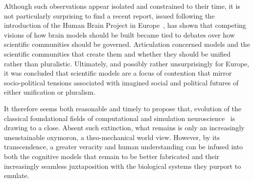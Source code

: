 \documentclass[11pt,3p,twocolumn]{JMN}
\begin{document}
Although such observations appear isolated and constrained to their time, it is not particularly surprising to find a recent report, issued following the introduction of the Human Brain Project in Europe~\citep{mahfoud21}, has shown that competing visions of how brain models should be built became tied to debates over how scientific communities should be governed. Articulation concerned models and the scientific communities that create them and whether they should be unified rather than pluralistic. Ultimately, and possibly rather unsurprisingly for Europe, it was concluded that scientific models are a focus of contention that mirror socio-political tensions associated with imagined social and political futures of either unification or pluralism.

It therefore seems both reasonable and timely to propose that, evolution of the classical foundational fields of computational and simulation neuroscience~\citep[see][]{fan19} is drawing to a close. Absent such extinction, what remains is only an increasingly unsustainable oxymoron, a theo-mechanical world view. However, by its transcendence, a greater veracity and human understanding can be infused into both the cognitive models that remain to be better fabricated and their increasingly seamless juxtaposition with the biological systems they purport to emulate. 


\end{document}
